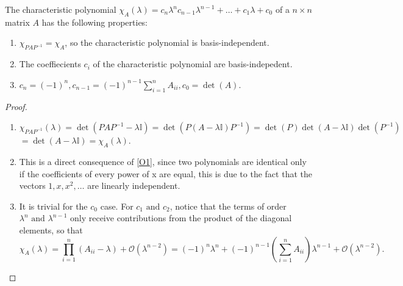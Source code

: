 \documentclass[a4paper,12pt]{report}
\begin{document}
\begin{lemma}
The characteristic polynomial \(\chi _{A}(\lambda ) = c_{n}\lambda ^{n} c_{n-1}\lambda ^{n-1} + \ldots + c_1 \lambda +c_0 \) of a \(n \times n\) matrix \(A\) has the following properties:

\begin{enumerate}[label=(\(O\)\arabic*)]
    \item \(\chi _{PAP^{-1} } = \chi _{A}  \), so the characteristic polynomial is basis-independent. \label{O1} 
    \item The coeffiecients \(c_{i} \) of the characteristic polynomial are basis-indepedent.
    \item \(c_{n} = (-1)^{n}, c_{n-1} = (-1)^{n-1}\sum_{i=1}^{n} A_{ii}, c_0 = \det (A)\).    
\end{enumerate}

\end{lemma}


\begin{proof}
\begin{enumerate}[label=(\(O\)\arabic*)] 
    \item \(\chi _{PAP^{-1} }(\lambda ) = \det (PAP^{-1} - \lambda \mathbb{I}) = \det (P(A-\lambda \mathbb{I})P^{-1} ) = \det (P)\det (A-\lambda \mathbb{I}) \det (P^{-1} )\) \(= \det (A - \lambda \mathbb{I}) = \chi _{A}(\lambda )  \).
    \item This is a direct consequence of \cref{O1}, since two polynomials are identical only if the coefficients of every power of x are equal, this is due to the fact that the vectors \(1, x, x^2, \ldots \) are linearly independent.
    \item It is trivial for the \(c_0 \) case. For \(c_1 \text { and } c_2 \), notice that the terms of order \(\lambda ^{n} \text { and } \lambda ^{n-1} \) only receive contributions from the product of the diagonal elements, so that
    \begin{equation}
        \chi _{A}(\lambda ) =   \prod_{i=1}^{n} (A_{ii} - \lambda  ) + \mathcal{O}(\lambda ^{n-2} ) = (-1)^{n} \lambda ^{n} + (-1)^{n-1} \left( \sum_{i=1}^{n} A_{ii}  \right) \lambda ^{n-1} + \mathcal{O}(\lambda ^{n-2} ).     
    \end{equation}
    
    
\end{enumerate}

\end{proof}
\end{document}
